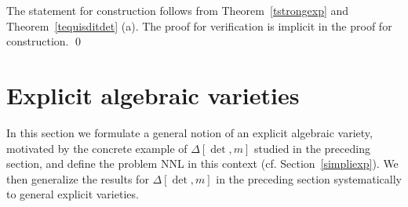\documentclass[11pt]{article}
\begin{document}
\proof 
The statement for construction follows from Theorem~\ref{tstrongexp} 
and  Theorem~\ref{tequisditdet} (a). The proof for
verification  is implicit in the proof for  construction. \qed 


%
\section{Explicit algebraic varieties} \label{sexplicit}
In this section we formulate a general notion of 
an explicit algebraic variety,  motivated by the concrete example of
$\Delta[\det,m]$ studied in the preceding section, and  define the problem NNL in this context (cf. Section~\ref{simpliexp}).
We then generalize the results for $\Delta[\det,m]$ in the preceding section systematically to general explicit varieties.
\end{document}
